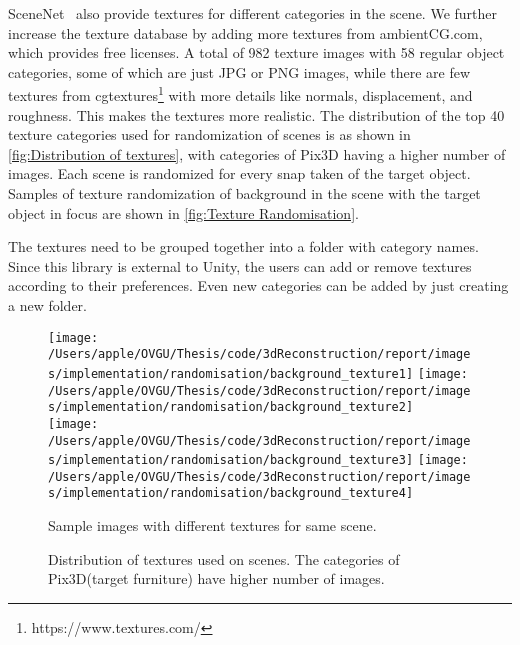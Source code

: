 SceneNet~\cite{McCormac2017} also provide textures for different categories in the scene.
We further increase the texture database by adding more textures from ambientCG.com, which provides free licenses.
A total of 982 texture images with 58 regular object categories, some of which are just JPG or PNG images, while there are few textures from cgtextures\footnote{https://www.textures.com/} with more details like normals, displacement, and roughness.
This makes the textures more realistic.
The distribution of the top 40 texture categories used for randomization of scenes is as shown in \autoref{fig:Distribution of textures}, with categories of Pix3D
having a higher number of images.
Each scene is randomized for every snap taken of the target object.
Samples of texture randomization of background in the scene with the target object in focus are shown in \autoref{fig:Texture Randomisation}.

The textures need to be grouped together into a folder with category names.
Since this library is external to Unity, the users can add or remove textures according to their preferences.
Even new categories can be added by just creating a new folder.

\begin{figure}[!ht]
    \centering
    \texttt{[image: /Users/apple/OVGU/Thesis/code/3dReconstruction/report/images/implementation/randomisation/background\_texture1]}
    \texttt{[image: /Users/apple/OVGU/Thesis/code/3dReconstruction/report/images/implementation/randomisation/background\_texture2]}\\
    \vspace{0.1cm}
    \texttt{[image: /Users/apple/OVGU/Thesis/code/3dReconstruction/report/images/implementation/randomisation/background\_texture3]}
    \texttt{[image: /Users/apple/OVGU/Thesis/code/3dReconstruction/report/images/implementation/randomisation/background\_texture4]}\\
    \caption[Samples for Different Textures.]{Sample images with different textures for same scene.}
    \label{fig:Texture Randomisation}
\end{figure}

\begin{figure}[!ht]
    \centering
    \resizebox{\textwidth}{11.5cm}{}
    \caption[Distribution of Textures.]{Distribution of textures used on scenes. The categories of Pix3D(target furniture) have higher number of images.}
    \label{fig:Distribution of textures}
\end{figure}

